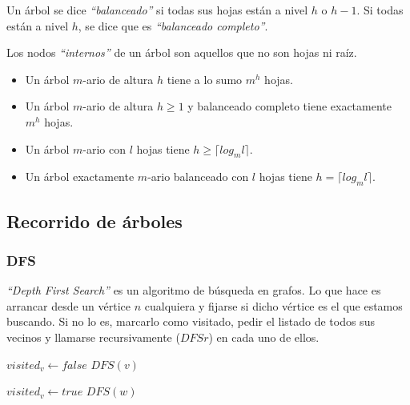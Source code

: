 Un \'arbol se dice \emph{``balanceado''} si todas sus hojas est\'an a nivel $h$ o $h-1$. Si todas est\'an a nivel $h$, se dice que es \emph{``balanceado completo''}.

Los nodos \emph{``internos''} de un \'arbol son aquellos que no son hojas ni ra\'iz.

\begin{itemize}
\item Un \'arbol $m$-ario de altura $h$ tiene a lo sumo $m^h$ hojas. 
\item Un \'arbol $m$-ario de altura $h \geq 1$ y balanceado completo tiene exactamente $m^h$ hojas.
\item Un \'arbol $m$-ario con $l$ hojas tiene $h \geq \lceil log_{m}l \rceil$.
\item Un \'arbol exactamente $m$-ario balanceado con $l$ hojas tiene $h = \lceil log_{m}l \rceil$.
\end{itemize}

\subsection{Recorrido de \'arboles}
\subsubsection{DFS}

\emph{``Depth First Search''} es un algoritmo de b\'usqueda en grafos. Lo que hace es arrancar desde un v\'ertice $n$ cualquiera y fijarse si dicho v\'ertice es el que estamos buscando. Si no lo es, marcarlo como visitado, pedir el listado de todos sus vecinos y llamarse recursivamente ($DFSr$) en cada uno de ellos.
\vspace{8px}

\begin{algorithm}
\begin{algorithmic}[1]
    \State $visited_v \gets false$
  \EndFor
      \State $DFS(v)$
    \EndIf
  \EndFor
\EndFunction
\end{algorithmic}
\end{algorithm}

\begin{algorithm}
\begin{algorithmic}[1]
  \State $visited_v \gets true$
      \State $DFS(w)$
    \EndIf
  \EndFor
\EndFunction
\end{algorithmic}
\end{algorithm}

